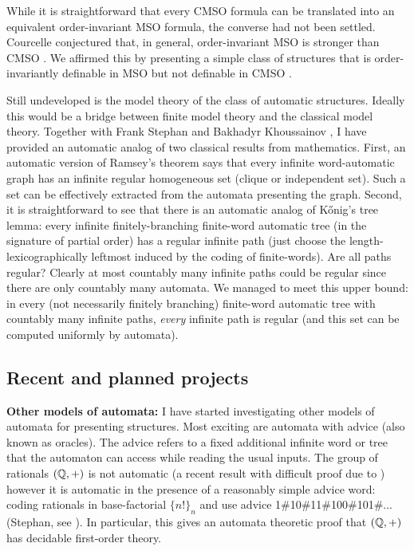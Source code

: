 \documentclass[12pt]{article}
\theoremstyle{plain} \numberwithin{equation}{section}
\theoremstyle{definition}
\def\tit#1{\subsection*{#1}}
\begin{document}
While it is straightforward that every CMSO formula can be translated into an equivalent order-invariant MSO formula, the converse had not been settled. Courcelle conjectured that, in general, order-invariant MSO is stronger than CMSO \cite{Cour96}. We affirmed this by presenting a simple class of structures that is order-invariantly definable in MSO but not definable in CMSO \cite{GaRu08}.

Still undeveloped is the model theory of the class of automatic structures. Ideally this would be a bridge between finite model theory and the classical model theory.
Together with Frank Stephan and Bakhadyr Khoussainov \cite{KRS05}, I have provided an automatic analog of two classical results from mathematics. First, an automatic version of Ramsey's theorem says that every infinite word-automatic graph has an infinite regular homogeneous set (clique or independent set). Such a set can be effectively extracted from the automata presenting the graph. Second, it is straightforward to see that there is an automatic analog of K\H{o}nig's tree lemma: every infinite finitely-branching finite-word automatic tree (in the signature of partial order) has a regular infinite path (just choose the length-lexicographically leftmost induced by the coding of finite-words). Are all paths regular? Clearly at most countably many infinite paths could be regular since there are only countably many automata. We managed to meet this upper bound: in every (not necessarily finitely branching) finite-word automatic tree with countably many infinite paths, {\it every} infinite path is regular (and this set can be computed uniformly by automata).
\fi

\tit{Recent and planned projects}

{\bf Other models of automata:} I have started investigating other models of automata for presenting structures. 
Most exciting are automata with advice (also known as oracles). The advice refers to a fixed additional infinite word or tree that the automaton can access while reading the usual inputs. The group of rationals $({\mathbb Q},+)$ is not automatic (a recent result with difficult proof due to \cite{Tsa}) however it is automatic in the presence of a reasonably simple advice word: coding rationals in base-factorial $\{n!\}_n$ and use advice 1\#10\#11\#100\#101\#... (Stephan, see \cite{Nies}).
In particular, this gives an automata theoretic proof that $({\mathbb Q},+)$ has decidable first-order theory. %
\end{document}
